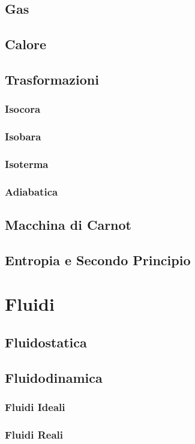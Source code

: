 \documentclass[12pt]{article}
\begin{document}
    \subsection{Gas}
    \subsection{Calore}
    \subsection{Trasformazioni}
        \subsubsection{Isocora}
        \subsubsection{Isobara}
        \subsubsection{Isoterma}
        \subsubsection{Adiabatica}
    \subsection{Macchina di Carnot}
    \subsection{Entropia e Secondo Principio}
\section{Fluidi}
    \subsection{Fluidostatica}
    \subsection{Fluidodinamica}
        \subsubsection{Fluidi Ideali}
        \subsubsection{Fluidi Reali}
\end{document}
